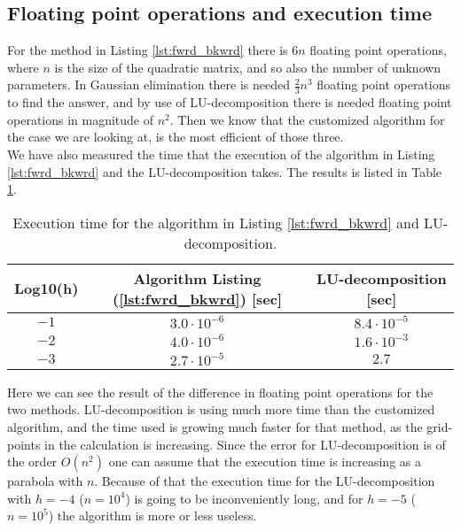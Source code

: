 \documentclass[12pt]{article}
\begin{document}
\begin{flushleft}
\subsection*{Floating point operations and execution time}
For the method in Listing \ref{lst:fwrd_bkwrd} there is $6n$ floating point operations, where $n$ is the size of the quadratic matrix, and so also the number of unknown parameters. In Gaussian elimination there is needed $\frac{2}{3}n^{3}$ floating point operations to find the answer, and by use of LU-decomposition there is needed floating point operations in magnitude of $n^2$. Then we know that the customized algorithm for the case we are looking at, is the most efficient of those three.\\
\vspace{5mm}
We have also measured the time that the execution of the algorithm in Listing \ref{lst:fwrd_bkwrd} and the LU-decomposition takes. The results is listed in Table \ref{tab:time}.
\vspace{5mm}
\begin{table}[!h]
\begin{center}
\begin{tabular}{| c | c | c |}
	\hline
	\textbf{Log10(h)}  & \textbf{Algorithm Listing (\ref{lst:fwrd_bkwrd}) [sec]} &  \textbf{LU-decomposition [sec]}\\
	\hline		
	$-1$ & $3.0\cdot 10^{-6}$ & $8.4\cdot 10^{-5}$ \\
    $-2$ & $4.0\cdot 10^{-6}$ & $1.6\cdot 10^{-3}$\\
    $-3$ & $2.7\cdot 10^{-5}$ & $2.7$\\
  \hline
\end{tabular}
\end{center}
\caption{\label{tab:time}Execution time for the algorithm in Listing \ref{lst:fwrd_bkwrd} and LU-decomposition.}
\end{table}
\vspace{5mm}

Here we can see the result of the difference in floating point operations for the two methods. LU-decomposition is using much more time than the customized algorithm, and the time used is growing much faster for that method, as the grid-points in the calculation is increasing. Since the error for LU-decomposition is of the order $O(n^2)$ one can assume that the execution time is increasing as a parabola with $n$. Because of that the execution time for the LU-decomposition with $h=-4$ ($n=10^4$) is going to be inconveniently long, and for $h=-5$ ($n=10^5$) the algorithm is more or less useless.  


\end{flushleft}
\end{document}
